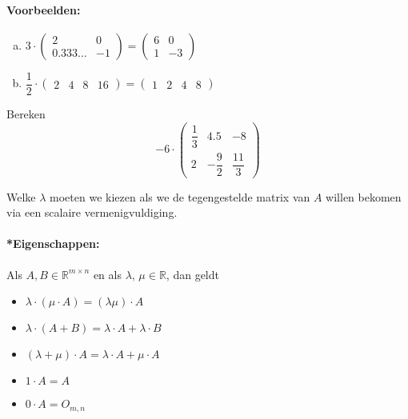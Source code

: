 \documentclass[12pt,twoside]{article}
\begin{document}
\paragraph*{Voorbeelden:}
\begin{enumerate}[(a)]
\item
  $3 \cdot
  \begin{pmatrix}
    2           & 0 \\
    0.333\ldots & -1
  \end{pmatrix}
  =
  \begin{pmatrix}
    6           & 0 \\
    1           & -3
  \end{pmatrix}
  $
\item
  $\dfrac{1}{2} \cdot
  \begin{pmatrix}
    2           & 4 & 8 & 16
  \end{pmatrix}
  =
  \begin{pmatrix}
    1           & 2 & 4 & 8
  \end{pmatrix}
  $
\end{enumerate}

\begin{oefening}
  Bereken
  $$
  -6 \cdot
  \begin{pmatrix}
    \dfrac{1}{3} & 4.5 & -8\\
    2 & -\dfrac{9}{2} & \dfrac{11}{3}
  \end{pmatrix}
  $$
\end{oefening}

\begin{oefening}
  Welke $\lambda$ moeten we kiezen als we de tegengestelde matrix van $A$ willen bekomen via een scalaire vermenigvuldiging.
\end{oefening}

\paragraph*{*Eigenschappen:}
Als $A,B \in \mathbb{R}^{m \times n}$ en als $\lambda,\,\mu \in \mathbb{R}$, dan geldt
\begin{itemize}
\item $\lambda \cdot (\mu \cdot A) = (\lambda \mu) \cdot A$
\item $\lambda \cdot (A + B) = \lambda \cdot A + \lambda \cdot B$
\item $(\lambda + \mu) \cdot A = \lambda \cdot A + \mu \cdot A$
\item $1 \cdot A = A$
\item $0 \cdot A = O_{m,n}$
\end{itemize}
\end{document}
